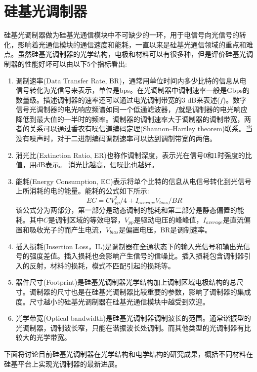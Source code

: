 \section{硅基光调制器}
硅基光调制器做为硅基光通信模块中不可缺少的一环，用于电信号向光信号的转化，影响着光通信模块的通信速度和能耗，一直以来是硅基光通信领域的重点和难点。虽然硅基光调制器的光学结构，电极和材料可以有很多种，但是评价硅基光调制器的性能好坏可以由以下5个指标看出:
\begin{enumerate}[(1)]
	\item 调制速率(Data Transfer Rate, BR)，通常用单位时间内多少比特的信息从电信号转化为光信号来表示，单位是bps。在光调制器中调制速率一般是Gbps的数量级。描述调制器的速率还可以通过电光调制带宽的3 dB来表述($f$)。数字信号光调制器的电光响应频谱如同一个低通滤波器，$f$就是调制器的电光响应降低到最大值的一半时的频率。调制器的调制速率大于调制器的调制带宽，两者的关系可以通过香农有噪信道编码定理(Shannon–Hartley theorem)联系。当没有噪声时，对于二进制编码调制速率可以达到调制带宽的两倍。
	\item 消光比(Extinction Ratio, ER)也称作调制深度，表示光在信号0和1时强度的比值，用dB表示。 消光比越高，信噪比也越好。
	\item 能耗(Energy Consumption, EC)表示将单个比特的信息从电信号转化到光信号上所消耗的电的能量。能耗的公式如下所示:
		\begin{equation}
		\label{Equ:EC}
		EC = CV_{pp}^{2}/4 + I_{average}V_{bias}/BR
		\end{equation}
	该公式分为两部分，第一部分是动态调制的能耗和第二部分是静态偏置的能耗。其中$C$是调制区域的等效电容，$V_{pp}$是驱动电压的峰峰值，$I_{average}$是直流偏置和吸收光子的而产生电流，$V_{bias}$是偏置电压，BR是调制速率。
	\item 插入损耗(Insertion Loss，IL)是调制器在全通状态下的输入光信号和输出光信号的强度差值。插入损耗也会影响产生信号的信噪比。插入损耗包含调制器引入的反射，材料的损耗，模式不匹配引起的损耗等。
	\item 器件尺寸(Footprint)是硅基光调制器光学结构加上调制区域电极结构的总尺寸。调制器的尺寸也是在硅基光调制器比较重要的参数，影响了调制器的集成度。尺寸越小的硅基光调制器在硅基光通信模块中越受到欢迎。
	\item 光学带宽(Optical bandwidth)是硅基光调制器调制波长的范围。通常谐振型的光调制器，调制波长窄，只能在谐振波长处调制。而其他类型的光调制器有比较大的光学带宽。	
\end{enumerate}

下面将讨论目前硅基光调制器在光学结构和电学结构的研究成果，概括不同材料在硅基平台上实现光调制器的最新进展。
